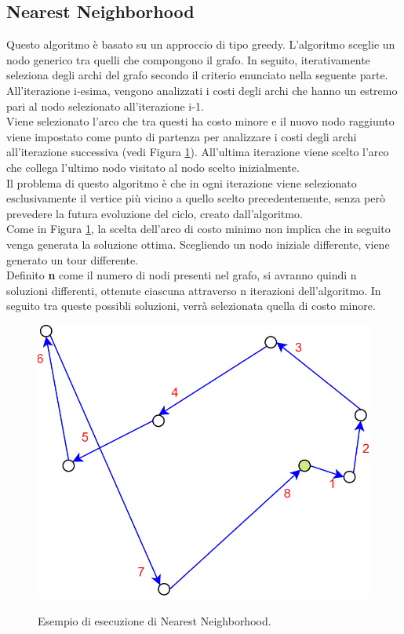 \subsection{Nearest Neighborhood}
Questo algoritmo è basato su un approccio di tipo greedy.
L'algoritmo sceglie un nodo generico tra quelli che compongono il grafo. In seguito, iterativamente seleziona degli archi del grafo secondo il criterio enunciato nella seguente parte.\\
All'iterazione i-esima, vengono analizzati i costi degli archi che hanno un estremo pari al nodo selezionato all'iterazione i-1.\\
Viene selezionato l'arco che tra questi ha costo minore e il nuovo nodo raggiunto viene impostato come punto di partenza per analizzare i costi degli archi all'iterazione successiva (vedi Figura \ref{nearest_neighborhood}). All'ultima iterazione viene scelto l'arco che collega l'ultimo nodo visitato al nodo scelto inizialmente.\\
Il problema di questo algoritmo è che in ogni iterazione viene selezionato esclusivamente il vertice più vicino a quello scelto precedentemente, senza però prevedere la futura evoluzione del ciclo, creato dall'algoritmo.\\
Come in Figura \ref{nearest_neighborhood}, la scelta dell'arco di costo minimo non implica che in seguito venga generata la soluzione ottima. Scegliendo un nodo iniziale differente, viene generato un tour differente.\\
Definito \textbf{n} come il numero di nodi presenti nel grafo, si avranno quindi n soluzioni differenti, ottenute ciascuna attraverso n iterazioni dell'algoritmo. In seguito tra queste possibli soluzioni, verrà selezionata quella di costo minore.\\
\begin{figure}[h] 
\begin{center} 
  \includegraphics[scale=0.4]{Images/nearest_neighborhood}\\ 
  \caption{\footnotesize{Esempio di esecuzione di Nearest Neighborhood.}}
  \label{nearest_neighborhood} 
\end{center} 
\end{figure}

